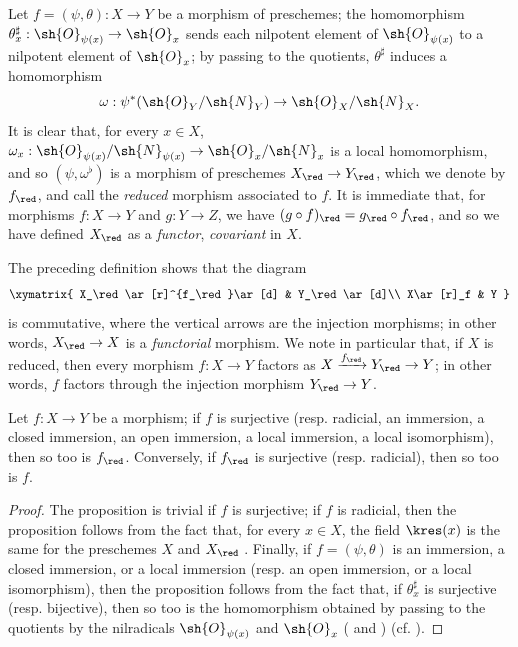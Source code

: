 \begin{env}[5.1.5]
\label{I.5.1.5}
Let $f=(\psi,\theta):X\to Y$ be a morphism of preschemes;
the homomorphism $\theta_x^\sharp:\sh{O}_{\psi(x)}\to\sh{O}_x$ sends each nilpotent element of $\sh{O}_{\psi(x)}$ to a nilpotent element of $\sh{O}_x$;
by passing to the quotients, $\theta^\sharp$ induces a homomorphism
\[
  \omega:\psi^*(\sh{O}_Y/\sh{N}_Y)\to\sh{O}_X/\sh{N}_X.
\]
It is clear that, for every $x\in X$, $\omega_x:\sh{O}_{\psi(x)}/\sh{N}_{\psi(x)}\to\sh{O}_x/\sh{N}_x$ is a local homomorphism, and so $(\psi,\omega^\flat)$ is a morphism of preschemes $X_\red\to Y_\red$, which we denote by $f_\red$, and call the \emph{reduced} morphism associated to $f$.
It is immediate that, for morphisms $f:X\to Y$ and $g:Y\to Z$, we have $(g\circ f)_\red=g_\red\circ f_\red$, and so we have defined $X_\red$ as a \emph{functor}, \emph{covariant} in $X$.

The preceding definition shows that the diagram
\[
  \xymatrix{
    X_\red\ar[r]^{f_\red}\ar[d] &
    Y_\red\ar[d]\\
    X\ar[r]_f &
    Y
  }
\]
is commutative, where the vertical arrows are the injection morphisms;
in other words, $X_\red\to X$ is a \emph{functorial} morphism.
We note in particular that, if $X$ is reduced, then every morphism $f:X\to Y$ factors as $X\xrightarrow{f_\red}Y_\red\to Y$;
in other words, $f$ factors through the injection morphism $Y_\red\to Y$.
\end{env}

\begin{proposition}[5.1.6]
\label{I.5.1.6}
Let $f:X\to Y$ be a morphism;
if $f$ is surjective (resp. radicial, an immersion, a closed immersion, an open immersion, a local immersion, a local isomorphism), then so too is $f_\red$.
Conversely, if $f_\red$ is surjective (resp. radicial), then so too is $f$.
\end{proposition}

\begin{proof}
The proposition is trivial if $f$ is surjective;
if $f$ is radicial, then the proposition follows from the fact that, for every $x\in X$, the field $\kres(x)$ is the same for the preschemes $X$ and $X_\red$ .
Finally, if $f=(\psi,\theta)$ is an immersion, a closed immersion, or a local immersion (resp. an open immersion, or a local isomorphism), then the proposition follows from the fact that, if $\theta_x^\sharp$ is surjective (resp. bijective), then so too is the homomorphism obtained by passing to the quotients by the nilradicals $\sh{O}_{\psi(x)}$ and $\sh{O}_x$ ( and ) (cf. ).
\end{proof}

